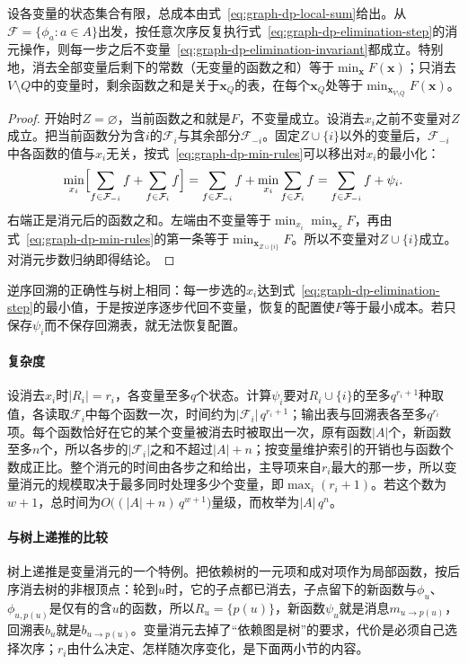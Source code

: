 \begin{theorem}[变量消元的正确性]
\label{thm:graph-dp-elimination}
设各变量的状态集合有限，总成本由式~\eqref{eq:graph-dp-local-sum}给出。从$\mathcal F=\{\phi_a:a\in A\}$出发，按任意次序反复执行式~\eqref{eq:graph-dp-elimination-step}的消元操作，则每一步之后不变量~\eqref{eq:graph-dp-elimination-invariant}都成立。特别地，消去全部变量后剩下的常数（无变量的函数之和）等于$\min_{\bm x}F(\bm x)$；只消去$V\setminus Q$中的变量时，剩余函数之和是关于$\bm x_Q$的表，在每个$\bm x_Q$处等于$\min_{\bm x_{V\setminus Q}}F(\bm x)$。
\end{theorem}

\begin{proof}
开始时$Z=\varnothing$，当前函数之和就是$F$，不变量成立。设消去$x_i$之前不变量对$Z$成立。把当前函数分为含$i$的$\mathcal F_i$与其余部分$\mathcal F_{-i}$。固定$Z\cup\{i\}$以外的变量后，$\mathcal F_{-i}$中各函数的值与$x_i$无关，按式~\eqref{eq:graph-dp-min-rules}可以移出对$x_i$的最小化：
\[
\min_{x_i}\Bigl[\sum_{f\in\mathcal F_{-i}}f+\sum_{f\in\mathcal F_i}f\Bigr]
=\sum_{f\in\mathcal F_{-i}}f+\min_{x_i}\sum_{f\in\mathcal F_i}f
=\sum_{f\in\mathcal F_{-i}}f+\psi_i .
\]
右端正是消元后的函数之和。左端由不变量等于$\min_{x_i}\min_{\bm x_Z}F$，再由式~\eqref{eq:graph-dp-min-rules}的第一条等于$\min_{\bm x_{Z\cup\{i\}}}F$。所以不变量对$Z\cup\{i\}$成立。对消元步数归纳即得结论。
\end{proof}

逆序回溯的正确性与树上相同：每一步选的$x_i$达到式~\eqref{eq:graph-dp-elimination-step}的最小值，于是按逆序逐步代回不变量，恢复的配置使$F$等于最小成本。若只保存$\psi_i$而不保存回溯表，就无法恢复配置。

\paragraph{复杂度}
设消去$x_i$时$|R_i|=r_i$，各变量至多$q$个状态。计算$\psi_i$要对$R_i\cup\{i\}$的至多$q^{r_i+1}$种取值，各读取$\mathcal F_i$中每个函数一次，时间约为$|\mathcal F_i|\,q^{r_i+1}$；输出表与回溯表各至多$q^{r_i}$项。每个函数恰好在它的某个变量被消去时被取出一次，原有函数$|A|$个，新函数至多$n$个，所以各步的$|\mathcal F_i|$之和不超过$|A|+n$；按变量维护索引的开销也与函数个数成正比。整个消元的时间由各步之和给出，主导项来自$r_i$最大的那一步，所以变量消元的规模取决于最多同时处理多少个变量，即$\max_i(r_i+1)$。若这个数为$w+1$，总时间为$O\bigl((|A|+n)\,q^{w+1}\bigr)$量级，而枚举为$|A|\,q^n$。

\paragraph{与树上递推的比较}
树上递推是变量消元的一个特例。把依赖树的一元项和成对项作为局部函数，按后序消去树的非根顶点：轮到$u$时，它的子点都已消去，子点留下的新函数与$\phi_u$、$\phi_{u,p(u)}$是仅有的含$u$的函数，所以$R_u=\{p(u)\}$，新函数$\psi_u$就是消息$m_{u\to p(u)}$，回溯表$b_u$就是$b_{u\to p(u)}$。变量消元去掉了“依赖图是树”的要求，代价是必须自己选择次序；$r_i$由什么决定、怎样随次序变化，是下面两小节的内容。

